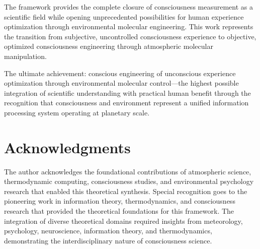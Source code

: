 \documentclass[12pt,a4paper]{article}
\begin{document}
The framework provides the complete closure of consciousness measurement as a scientific field while opening unprecedented possibilities for human experience optimization through environmental molecular engineering. This work represents the transition from subjective, uncontrolled consciousness experience to objective, optimized consciousness engineering through atmospheric molecular manipulation.

The ultimate achievement: conscious engineering of unconscious experience optimization through environmental molecular control—the highest possible integration of scientific understanding with practical human benefit through the recognition that consciousness and environment represent a unified information processing system operating at planetary scale.

\section*{Acknowledgments}

The author acknowledges the foundational contributions of atmospheric science, thermodynamic computing, consciousness studies, and environmental psychology research that enabled this theoretical synthesis. Special recognition goes to the pioneering work in information theory, thermodynamics, and consciousness research that provided the theoretical foundations for this framework. The integration of diverse theoretical domains required insights from meteorology, psychology, neuroscience, information theory, and thermodynamics, demonstrating the interdisciplinary nature of consciousness science.
\end{document}
